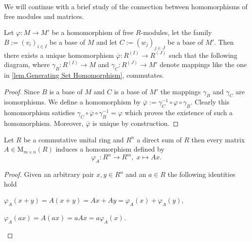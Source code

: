 We will continue with a brief study of the connection between homomorphisms of free modules and matrices.

\begin{pro}\label{prop.Commutative Diagram of Free Modules}
Let $\varphi\colon M\to M'$ be a homomorphism of free $R$-modules, let the family $B:=(v_i)_{i\in I}$ be a base of $M$ and let $C:=(w_j)_{j\in J}$ be a base of $M'$. Then there exists a unique homomorphism $\overline{\varphi}\colon R^{(I)}\to R^{(J)}$ such that the following diagram, where $\gamma_B\colon R^{(I)}\to M$ and $\gamma_C\colon R^{(J)}\to M'$ denote mappings like the one in \cref{lem.Generating Set Homomorphism}, commutates.
\begin{center}
\end{center}
\end{pro}
\begin{proof}
Since $B$ is a base of $M$ and $C$ is a base of $M'$ the mappings $\gamma_B$ and $\gamma_C$ are isomorphisms. We define a homomorphism by $\overline{\varphi}:=\gamma_C^{-1}\circ\varphi\circ\gamma_B$. Clearly this homomorphism satisfies $\gamma_C\circ\overline{\varphi}\circ\gamma_B^{-1}=\varphi$ which proves the existence of such a homomorphism. Moreover, $\overline{\varphi}$ is unique by construction.
\end{proof}

\begin{cor}\label{cor.Matrix implies Homomorphism}
Let $R$ be a commutative unital ring and $R^n$ a direct sum of $R$ then every matrix $A\in\mathrm{M}_{m\times n}(R)$ induces a homomorphism defined by
\begin{equation*}
\varphi_A\colon R^n\to R^m,\; x\mapsto Ax.
\end{equation*}
\end{cor}
\begin{proof}
Given an arbitrary pair $x,y\in R^n$ and an $a\in R$ the following identities hold
\begin{exlist}
\item $\varphi_A(x+y)=A(x+y)=Ax+Ay=\varphi_A(x)+\varphi_A(y)$,
\item $\varphi_A(ax)=A(ax)=aAx=a\varphi_A(x)$.
\end{exlist}
\end{proof}

